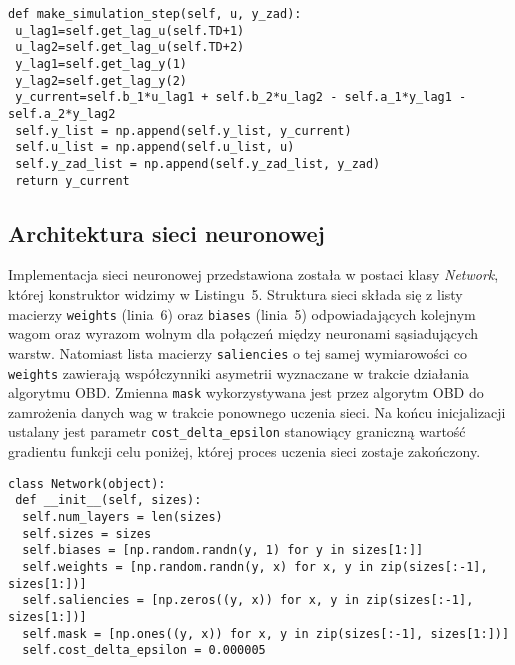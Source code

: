 \begin{listing}[!htb]
\begin{verbatim}
def make_simulation_step(self, u, y_zad):		
 u_lag1=self.get_lag_u(self.TD+1)
 u_lag2=self.get_lag_u(self.TD+2)
 y_lag1=self.get_lag_y(1)
 y_lag2=self.get_lag_y(2)
 y_current=self.b_1*u_lag1 + self.b_2*u_lag2 - self.a_1*y_lag1 - self.a_2*y_lag2
 self.y_list = np.append(self.y_list, y_current)
 self.u_list = np.append(self.u_list, u)
 self.y_zad_list = np.append(self.y_zad_list, y_zad)
 return y_current
\end{verbatim}
\end{listing}
 
\subsection{Architektura sieci neuronowej}
Implementacja sieci neuronowej przedstawiona została w postaci klasy \emph{Network}, której konstruktor widzimy w Listingu~5. Struktura sieci składa się z listy macierzy \texttt{weights} (linia~6) oraz \texttt{biases} (linia~5) odpowiadających kolejnym wagom oraz wyrazom wolnym dla połączeń między neuronami sąsiadujących warstw. Natomiast lista macierzy \texttt{saliencies} o tej samej wymiarowości co \texttt{weights} zawierają współczynniki asymetrii wyznaczane w trakcie działania algorytmu OBD. Zmienna \texttt{mask} wykorzystywana jest przez algorytm OBD do zamrożenia danych wag w trakcie ponownego uczenia sieci. Na końcu inicjalizacji ustalany jest parametr \texttt{cost{\_}delta{\_}epsilon} stanowiący graniczną wartość gradientu funkcji celu poniżej, której proces uczenia sieci zostaje zakończony. 
  
\begin{listing}[!htb]
\begin{verbatim}
class Network(object):
 def __init__(self, sizes): 
  self.num_layers = len(sizes)
  self.sizes = sizes
  self.biases = [np.random.randn(y, 1) for y in sizes[1:]]
  self.weights = [np.random.randn(y, x) for x, y in zip(sizes[:-1], sizes[1:])]
  self.saliencies = [np.zeros((y, x)) for x, y in zip(sizes[:-1], sizes[1:])]
  self.mask = [np.ones((y, x)) for x, y in zip(sizes[:-1], sizes[1:])]
  self.cost_delta_epsilon = 0.000005
\end{verbatim}
\end{listing}

